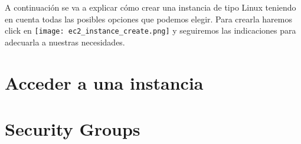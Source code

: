 A continuación se va a explicar cómo crear una instancia de tipo Linux teniendo en cuenta todas las posibles opciones que podemos elegir. Para crearla haremos click en \texttt{[image: ec2\_instance\_create.png]} y seguiremos las indicaciones para adecuarla a nuestras necesidades.


\chapter{Acceder a una instancia}


\chapter{Security Groups}




